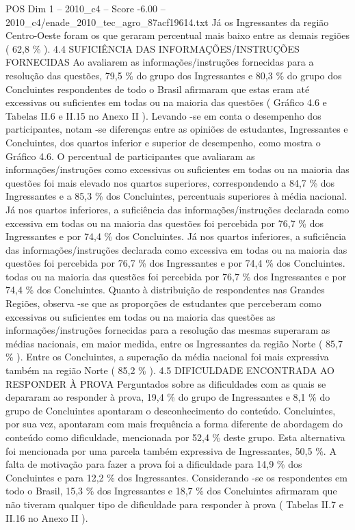 \begin{textsample}{POS Dim 1 – 2010\_c4 – Score -6.00 – 2010\_c4/enade\_2010\_tec\_agro\_87acf19614.txt}
Já os Ingressantes da região Centro-Oeste foram os que geraram percentual mais baixo entre as demais regiões ( 62,8 \% ). 4.4 SUFICIÊNCIA DAS INFORMAÇÕES/INSTRUÇÕES FORNECIDAS Ao avaliarem as informações/instruções fornecidas para a resolução das questões, 79,5 \% do grupo dos Ingressantes e 80,3 \% do grupo dos Concluintes respondentes de todo o Brasil afirmaram que estas eram até excessivas ou suficientes em todas ou na maioria das questões ( Gráfico 4.6 e Tabelas II.6 e II.15 no Anexo II ).
Levando -se em conta o desempenho dos participantes, notam -se diferenças entre as opiniões de estudantes, Ingressantes e Concluintes, dos quartos inferior e superior de desempenho, como mostra o Gráfico 4.6.
O percentual de participantes que avaliaram as informações/instruções como excessivas ou suficientes em todas ou na maioria das questões foi mais elevado nos quartos superiores, correspondendo a 84,7 \% dos Ingressantes e a 85,3 \% dos Concluintes, percentuais superiores à média nacional.
Já nos quartos inferiores, a suficiência das informações/instruções declarada como excessiva em todas ou na maioria das questões foi percebida por 76,7 \% dos Ingressantes e por 74,4 \% dos Concluintes.
Já nos quartos inferiores, a suficiência das informações/instruções declarada como excessiva em todas ou na maioria das questões foi percebida por 76,7 \% dos Ingressantes e por 74,4 \% dos Concluintes. todas ou na maioria das questões foi percebida por 76,7 \% dos Ingressantes e por 74,4 \% dos Concluintes.
Quanto à distribuição de respondentes nas Grandes Regiões, observa -se que as proporções de estudantes que perceberam como excessivas ou suficientes em todas ou na maioria das questões as informações/instruções fornecidas para a resolução das mesmas superaram as médias nacionais, em maior medida, entre os Ingressantes da região Norte ( 85,7 \% ).
Entre os Concluintes, a superação da média nacional foi mais expressiva também na região Norte ( 85,2 \% ). 4.5 DIFICULDADE ENCONTRADA AO RESPONDER À PROVA Perguntados sobre as dificuldades com as quais se depararam ao responder à prova, 19,4 \% do grupo de Ingressantes e 8,1 \% do grupo de Concluintes apontaram o desconhecimento do conteúdo.
Concluintes, por sua vez, apontaram com mais frequência a forma diferente de abordagem do conteúdo como dificuldade, mencionada por 52,4 \% deste grupo.
Esta alternativa foi mencionada por uma parcela também expressiva de Ingressantes, 50,5 \%.
A falta de motivação para fazer a prova foi a dificuldade para 14,9 \% dos Concluintes e para 12,2 \% dos Ingressantes.
Considerando -se os respondentes em todo o Brasil, 15,3 \% dos Ingressantes e 18,7 \% dos Concluintes afirmaram que não tiveram qualquer tipo de dificuldade para responder à prova ( Tabelas II.7 e II.16 no Anexo II ).

\end{textsample}
